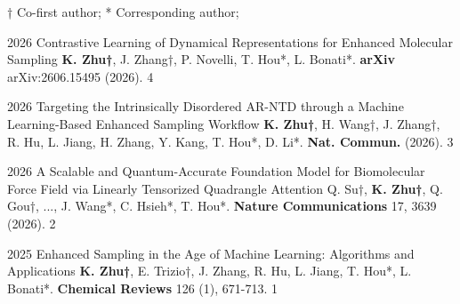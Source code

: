 
† Co-first author; * Corresponding author;

\pubitem
  {2026}
  {Contrastive Learning of Dynamical Representations for Enhanced Molecular Sampling}
  {\textbf{\textcolor{awesome}{K. Zhu†}}, J. Zhang†, P. Novelli, T. Hou*, L. Bonati*.
   \textbf{\textcolor{awesome}{arXiv}} arXiv:2606.15495 (2026).}
  {4}
  
\pubitem
  {2026}
  {Targeting the Intrinsically Disordered AR-NTD through a Machine Learning-Based Enhanced Sampling Workflow}
  {\textbf{\textcolor{awesome}{K. Zhu†}}, H. Wang†, J. Zhang†, R. Hu, L. Jiang, H. Zhang, Y. Kang, T. Hou*, D. Li*.
   \textbf{\textcolor{awesome}{Nat. Commun.}} (2026).}
  {3}

\pubitem
  {2026}
  {A Scalable and Quantum-Accurate Foundation Model for Biomolecular Force Field via Linearly Tensorized Quadrangle Attention}
  {Q. Su†, \textbf{\textcolor{awesome}{K. Zhu†}}, Q. Gou†, ..., J. Wang*, C. Hsieh*, T. Hou*.
   \textbf{\textcolor{awesome}{Nature Communications}} 17, 3639 (2026).}
  {2}

\pubitem
  {2025}
  {Enhanced Sampling in the Age of Machine Learning: Algorithms and Applications}
  {\textbf{\textcolor{awesome}{K. Zhu†}}, E. Trizio†, J. Zhang, R. Hu, L. Jiang, T. Hou*, L. Bonati*. 
   \textbf{\textcolor{awesome}{Chemical Reviews}} 126 (1), 671-713.}
  {1}